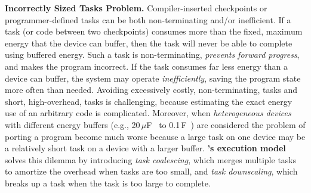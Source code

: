\textbf{Incorrectly Sized Tasks Problem.} Compiler-inserted checkpoints or
programmer-defined tasks can be both non-terminating and/or
inefficient.  If a task (or code between two checkpoints) consumes more than the fixed,
maximum energy that the device can buffer, then the task
will never be able to complete using buffered energy.  Such a task is
non-terminating, {\em prevents forward progress}, and makes the program
incorrect. 
%
If the task consumes far less energy than a device can buffer, the system
may operate {\em inefficiently}, saving the program state more often than needed.
%
Avoiding excessively costly, non-terminating, tasks and short, high-overhead,
tasks is challenging, because estimating the exact energy use of an arbitrary code is complicated.  
Moreover, when \emph{heterogeneous devices} with different energy buffers (e.g., 20\,$\mu $F~\cite{rodriguez_tbcs_2015} to 0.1\,F~\cite{moo}) are considered the problem of porting a program become much worse
because a large task on one device may be a relatively short task
on a device with a larger buffer.
%
\textbf{\sys's execution model} solves this dilemma by introducing {\em task coalescing}, which
merges multiple tasks to amortize the overhead when tasks are too small, and
{\em task downscaling}, which breaks up a task when the task is too large to complete. 

